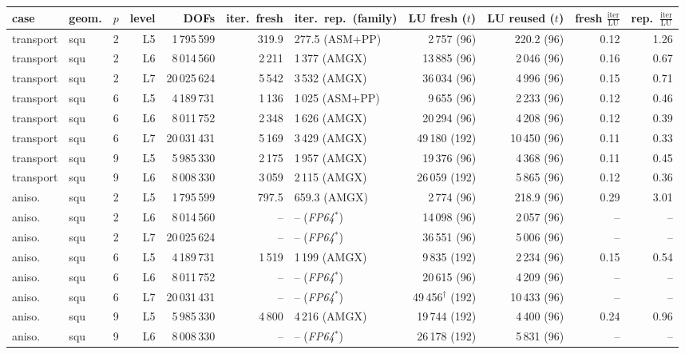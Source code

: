 \begin{tabular}{llrrrrlrrrr}
\toprule
case & geom. & $p$ & level & DOFs & iter.\ fresh & iter.\ rep.\ (family) & LU fresh ($t$) & LU reused ($t$) & fresh $\frac{\mathrm{iter}}{\mathrm{LU}}$ & rep.\ $\frac{\mathrm{iter}}{\mathrm{LU}}$\\
\midrule
transport & squ & 2 & L5 & 1\,795\,599 & 319.9 & 277.5 (ASM+PP) & 2\,757 (96) & 220.2 (96) & 0.12 & 1.26\\
transport & squ & 2 & L6 & 8\,014\,560 & 2\,211 & 1\,377 (AMGX) & 13\,885 (96) & 2\,046 (96) & 0.16 & 0.67\\
transport & squ & 2 & L7 & 20\,025\,624 & 5\,542 & 3\,532 (AMGX) & 36\,034 (96) & 4\,996 (96) & 0.15 & 0.71\\
transport & squ & 6 & L5 & 4\,189\,731 & 1\,136 & 1\,025 (ASM+PP) & 9\,655 (96) & 2\,233 (96) & 0.12 & 0.46\\
transport & squ & 6 & L6 & 8\,011\,752 & 2\,348 & 1\,626 (AMGX) & 20\,294 (96) & 4\,208 (96) & 0.12 & 0.39\\
transport & squ & 6 & L7 & 20\,031\,431 & 5\,169 & 3\,429 (AMGX) & 49\,180 (192) & 10\,450 (96) & 0.11 & 0.33\\
transport & squ & 9 & L5 & 5\,985\,330 & 2\,175 & 1\,957 (AMGX) & 19\,376 (96) & 4\,368 (96) & 0.11 & 0.45\\
transport & squ & 9 & L6 & 8\,008\,330 & 3\,059 & 2\,115 (AMGX) & 26\,059 (192) & 5\,865 (96) & 0.12 & 0.36\\
aniso. & squ & 2 & L5 & 1\,795\,599 & 797.5 & 659.3 (AMGX) & 2\,774 (96) & 218.9 (96) & 0.29 & 3.01\\
aniso. & squ & 2 & L6 & 8\,014\,560 & -- & -- (\emph{FP64}$^*$) & 14\,098 (96) & 2\,057 (96) & -- & --\\
aniso. & squ & 2 & L7 & 20\,025\,624 & -- & -- (\emph{FP64}$^*$) & 36\,551 (96) & 5\,006 (96) & -- & --\\
aniso. & squ & 6 & L5 & 4\,189\,731 & 1\,519 & 1\,199 (AMGX) & 9\,835 (192) & 2\,234 (96) & 0.15 & 0.54\\
aniso. & squ & 6 & L6 & 8\,011\,752 & -- & -- (\emph{FP64}$^*$) & 20\,615 (96) & 4\,209 (96) & -- & --\\
aniso. & squ & 6 & L7 & 20\,031\,431 & -- & -- (\emph{FP64}$^*$) & 49\,456$^\dagger$ (192) & 10\,433 (96) & -- & --\\
aniso. & squ & 9 & L5 & 5\,985\,330 & 4\,800 & 4\,216 (AMGX) & 19\,744 (192) & 4\,400 (96) & 0.24 & 0.96\\
aniso. & squ & 9 & L6 & 8\,008\,330 & -- & -- (\emph{FP64}$^*$) & 26\,178 (192) & 5\,831 (96) & -- & --\\

\end{tabular}
